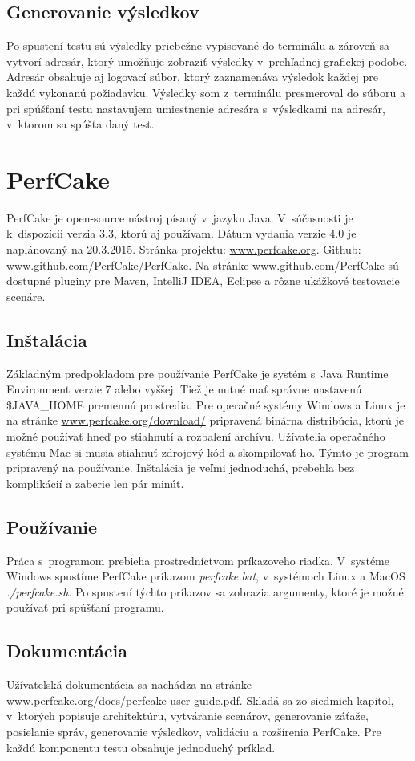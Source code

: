 \documentclass[12pt,oneside,final]{fithesis-utf8}
\begin{document}
\subsection{Generovanie výsledkov}
Po spustení testu sú výsledky priebežne vypisované do terminálu a zároveň sa vytvorí adresár, ktorý umožňuje zobraziť výsledky v~prehľadnej grafickej podobe. Adresár obsahuje aj logovací súbor, ktorý zaznamenáva výsledok každej pre každú vykonanú požiadavku. Výsledky som z~terminálu presmeroval do súboru a pri spúšťaní testu nastavujem umiestnenie adresára s~výsledkami na adresár, v~ktorom sa spúšťa daný test.

\newpage
\section{PerfCake}
PerfCake je open-source nástroj písaný v~jazyku Java. V~súčasnosti je k~dispozícii verzia 3.3, ktorú aj používam. Dátum vydania verzie 4.0 je naplánovaný na 20.3.2015. Stránka projektu: \url{www.perfcake.org}. Github: \url{www.github.com/PerfCake/PerfCake}. Na stránke \url{www.github.com/PerfCake} sú dostupné pluginy pre Maven, IntelliJ IDEA, Eclipse a rôzne ukážkové testovacie scenáre. 

\subsection{Inštalácia}
Základným predpokladom pre používanie PerfCake je systém s~Java Runtime Environment verzie 7 alebo vyššej. Tiež je nutné mať správne nastavenú \$JAVA\_{}HOME premennú prostredia. Pre operačné systémy Windows a Linux je na stránke \url{www.perfcake.org/download/} pripravená binárna distribúcia, ktorú je možné používať hneď po stiahnutí a rozbalení archívu. Užívatelia operačného systému Mac si musia stiahnuť zdrojový kód a skompilovať ho. Týmto je program pripravený na používanie. Inštalácia je veľmi jednoduchá, prebehla bez komplikácií a zaberie len pár minút.

\subsection{Používanie}
Práca s~programom prebieha prostredníctvom príkazoveho riadka. V~systéme Windows spustíme PerfCake príkazom \textit{perfcake.bat}, v~systémoch Linux a MacOS \textit{./perfcake.sh}. Po spustení týchto príkazov sa zobrazia argumenty, ktoré je možné používať pri spúšťaní programu.

\subsection{Dokumentácia}
Užívateľská dokumentácia sa nachádza na stránke \url{www.perfcake.org/docs/perfcake-user-guide.pdf}. Skladá sa zo siedmich kapitol, v~ktorých popisuje architektúru, vytváranie scenárov, generovanie záťaže, posielanie správ, generovanie výsledkov, validáciu a rozšírenia PerfCake. Pre každú komponentu testu obsahuje jednoduchý príklad.
\end{document}

